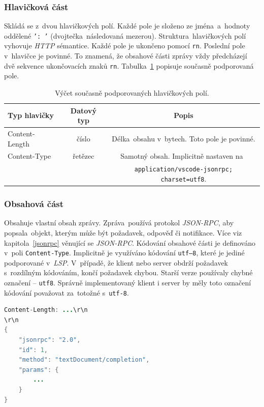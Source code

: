 \subsubsection{Hlavičková část}
Skládá se z~dvou hlavičkových polí. Každé pole je složeno ze jména~a~hodnoty oddělené \texttt{': '} (dvojtečka~následovaná mezerou). Struktura~hlavičkových polí vyhovuje \emph{HTTP} sémantice. Každé pole je ukončeno pomocí \texttt{rn}. Poslední pole v~hlavičce je povinné. To znamená, že obsahové části zprávy vždy předcházejí dvě sekvence ukončovacích znaků \texttt{rn}. Tabulka~\ref{podporovaneHlavicky} popisuje současně podporovaná pole.

\begin{table}[hbt]
\centering
\begin{tabular}{|l|c|c|}
\hline
Typ hlavičky & Datový typ & Popis \\ \hline
Content-Length & číslo & Délka~obsahu v~bytech. Toto pole je povinné. \\ \hline
Content-Type & řetězec & Samotný obsah. Implicitně nastaven na~\\ 
& & \texttt{application/vscode-jsonrpc; charset=utf8}. \\ \hline
\end{tabular}
\caption{\label{tab:SoucasnePodporovanaHlavickovaPole}Výčet současně podporovaných hlavičkových polí.}
\label{podporovaneHlavicky}
\end{table}

\subsubsection{Obsahová část}
Obsahuje vlastní obsah zprávy. Zpráva~používá protokol \emph{JSON-RPC}, aby popsala~objekt, kterým může být požadavek, odpověď či notifikace. Více viz kapitola~\ref{jsonrpc} věnující se \emph{JSON-RPC}. Kódování obsahové části je definováno v~poli \texttt{Content-Type}. Implicitně je využíváno kódování \texttt{utf–8}, které je jediné podporované v~\emph{LSP}. V~případě, že klient nebo server obdrží požadavek s~rozdílným kódováním, končí požadavek chybou. Starší verze používaly chybné označení -- \texttt{utf8}. Správně implementovaný klient i server by měly toto označení kódování považovat za~totožné s~\texttt{utf-8}.

\begin{lstlisting}[language=JAVA, caption=Ukázka~obsahu zprávy.]
Content-Length: ...\r\n
\r\n
{
	"jsonrpc": "2.0",
	"id": 1,
	"method": "textDocument/completion",
	"params": {
		...
	}
}
\end{lstlisting}

